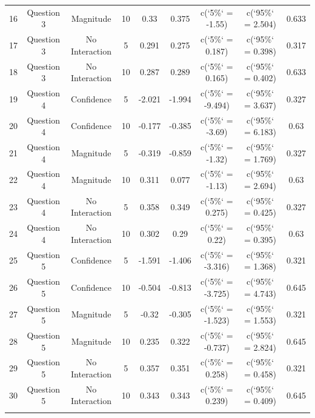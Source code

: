 \begin{table}[!htbp]
\begin{tabular}{@{\extracolsep{5pt}} ccccccccc}
16 & Question 3 & Magnitude & 10 & 0.33 & 0.375 & c(`5\%` = -1.55) & c(`95\%` = 2.504) & 0.633 \\ 
17 & Question 3 & No Interaction & 5 & 0.291 & 0.275 & c(`5\%` = 0.187) & c(`95\%` = 0.398) & 0.317 \\ 
18 & Question 3 & No Interaction & 10 & 0.287 & 0.289 & c(`5\%` = 0.165) & c(`95\%` = 0.402) & 0.633 \\ 
19 & Question 4 & Confidence & 5 & -2.021 & -1.994 & c(`5\%` = -9.494) & c(`95\%` = 3.637) & 0.327 \\ 
20 & Question 4 & Confidence & 10 & -0.177 & -0.385 & c(`5\%` = -3.69) & c(`95\%` = 6.183) & 0.63 \\ 
21 & Question 4 & Magnitude & 5 & -0.319 & -0.859 & c(`5\%` = -1.32) & c(`95\%` = 1.769) & 0.327 \\ 
22 & Question 4 & Magnitude & 10 & 0.311 & 0.077 & c(`5\%` = -1.13) & c(`95\%` = 2.694) & 0.63 \\ 
23 & Question 4 & No Interaction & 5 & 0.358 & 0.349 & c(`5\%` = 0.275) & c(`95\%` = 0.425) & 0.327 \\ 
24 & Question 4 & No Interaction & 10 & 0.302 & 0.29 & c(`5\%` = 0.22) & c(`95\%` = 0.395) & 0.63 \\ 
25 & Question 5 & Confidence & 5 & -1.591 & -1.406 & c(`5\%` = -3.316) & c(`95\%` = 1.368) & 0.321 \\ 
26 & Question 5 & Confidence & 10 & -0.504 & -0.813 & c(`5\%` = -3.725) & c(`95\%` = 4.743) & 0.645 \\ 
27 & Question 5 & Magnitude & 5 & -0.32 & -0.305 & c(`5\%` = -1.523) & c(`95\%` = 1.553) & 0.321 \\ 
28 & Question 5 & Magnitude & 10 & 0.235 & 0.322 & c(`5\%` = -0.737) & c(`95\%` = 2.824) & 0.645 \\ 
29 & Question 5 & No Interaction & 5 & 0.357 & 0.351 & c(`5\%` = 0.258) & c(`95\%` = 0.458) & 0.321 \\ 
30 & Question 5 & No Interaction & 10 & 0.343 & 0.343 & c(`5\%` = 0.239) & c(`95\%` = 0.409) & 0.645 \\ 
\hline \\[-1.8ex] 
\end{tabular} 
\end{table} 
